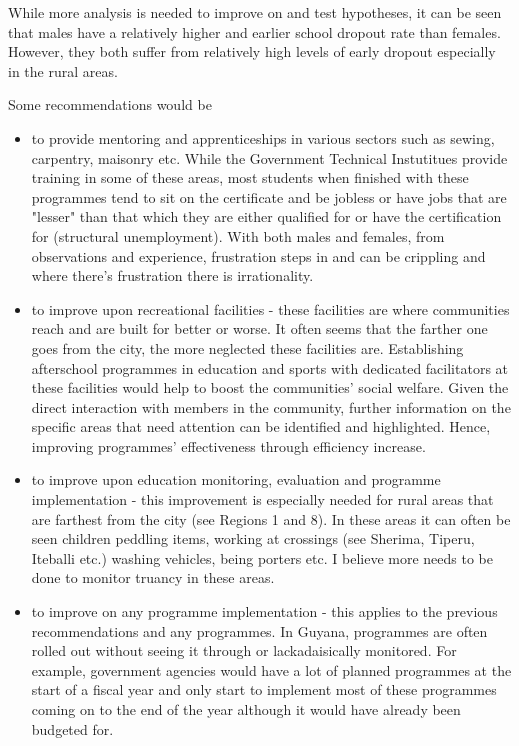 \documentclass[stu, 12pt, floatsintext,longtable]{apa7}
\begin{document}
While more analysis is needed to improve on and test hypotheses, it can be seen
that males have a relatively higher and earlier
school dropout rate than females. However, they both suffer from relatively
high levels
of early dropout especially in the rural areas.

Some recommendations would be

\begin{itemize}
    \item to provide mentoring and apprenticeships in various sectors such as
          sewing,
          carpentry, maisonry etc. While the Government Technical Instutitues
          provide training
          in some of these areas, most students when finished with these
          programmes tend to sit on the certificate and be jobless or have jobs
          that are "lesser" than that which they are either qualified for or
          have the
          certification for (structural unemployment). With both males and
          females, from observations and
          experience, frustration
          steps in and can be crippling and where there's frustration there is
          irrationality.
    \item to improve upon recreational facilities - these facilities are where
          communities reach and are built for better or worse. It often seems
          that the farther
          one goes from the city, the more neglected these facilities are.
          Establishing afterschool programmes in education and sports with
          dedicated
          facilitators at these facilities would help to boost the communities'
          social welfare.
          Given the direct interaction with members in the community, further
          information on the specific
          areas that need attention can be identified and highlighted. Hence,
          improving programmes' effectiveness through efficiency increase.
    \item to improve upon education monitoring, evaluation and programme
          implementation - this improvement is especially needed for rural
          areas that are farthest from the city (see Regions 1 and 8). In these
          areas
          it can often be seen
          children peddling items, working at crossings (see Sherima, Tiperu,
          Iteballi
          etc.) washing vehicles, being porters etc. I believe more needs to be
          done to monitor
          truancy in these areas.
    \item to improve on any programme implementation - this applies to the
          previous recommendations
          and any programmes. In Guyana, programmes are
          often rolled out without seeing it through or lackadaisically
          monitored. For example, government agencies would have a lot of
          planned programmes at the start of
          a fiscal year and only start to implement most of these programmes
          coming on to the end of the year although
          it would have already been budgeted for.
\end{itemize}
\end{document}
